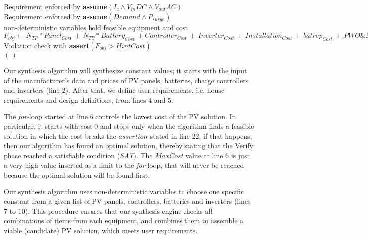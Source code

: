 \begin{algorithm}
\begin{algorithmic}[1]
 	\STATE Requirement enforced by \textbf{assume}$(I_{c} \wedge V_{in}DC \wedge V_{out}AC)$ \\
	\STATE Requirement enforced by \textbf{assume}$(Demand \wedge P_{surge})$ \\
	\STATE non-deterministic variables hold feasible equipment and cost  \\
	\STATE $F_{obj} \leftarrow  N_{TP}*Panel_{Cost} \, + \, N_{TB}*Battery_{Cost} \, + Controller_{Cost} \, + \, Inverter_{Cost} \, + \, Installation_{Cost} \, + \, batrep_{Cost} \, + \, PWO\&M_{Cost}$ \\
	\STATE Violation check with \textbf{assert}$(F_{obj} > HintCost)$ \\
  \ENDFOR
 \RETURN $(\,)$ 
 \end{algorithmic} 
 \label{alg:opt-algorithm}
 \end{algorithm}

Our synthesis algorithm will synthesize constant values; 
it starts with the input of the manufacturer's data and prices of PV panels, batteries, charge controllers and inverters (line $2$). After that, we define user requirements, i.e. house requirements and design definitions, from lines $4$ and $5$. 

The \textit{for}-loop started at line $6$ controls the lowest cost of the PV solution. In particular, it starts with cost $0$ and stops only when the algorithm finds a feasible solution in which the cost breaks the $assertion$ stated in line $22$; if that happens, then our algorithm has found an optimal solution, thereby stating that the {\sc Verify} phase reached a satisfiable condition (\textit{SAT}). The $MaxCost$ value at line $6$ is just a very high value inserted as a limit to the \textit{for}-loop, that will never be reached because the optimal solution will be found first.

Our synthesis algorithm uses non-deterministic variables to choose one specific constant from a given list of PV panels, controllers, batteries and inverters (lines $7$ to $10$). This procedure ensures that our synthesis engine checks all combinations of items from each equipment, and combines them to assemble a viable (candidate) PV solution, which meets user requirements.

